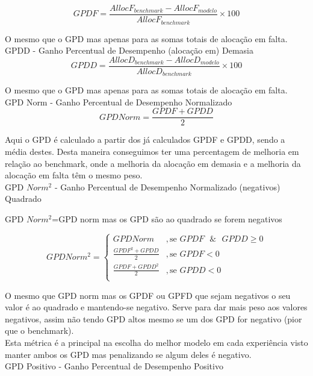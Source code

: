 \begin{equation} \label{eq:gpdf} 
    GPDF = \frac{AllocF_{benchmark} - AllocF_{modelo}}{AllocF_{benchmark}} \times 100
\end{equation}
\smallskip

O mesmo que o GPD mas apenas para as somas totais de alocação em falta.\\
\bigskip
GPDD - Ganho Percentual de Desempenho (alocação em) Demasia\\

\begin{equation} \label{eq:gpdd} 
    GPDD = \frac{AllocD_{benchmark} - AllocD_{modelo}}{AllocD_{benchmark}} \times 100
\end{equation}
\smallskip

O mesmo que o GPD mas apenas para as somas totais de alocação em falta.\\
\bigskip
GPD Norm - Ganho Percentual de Desempenho Normalizado \\

\begin{equation} \label{eq:gpdnorm} 
    GPD Norm = \frac{GPDF + GPDD}{2}
\end{equation}
\smallskip

Aqui o GPD é calculado a partir dos já calculados GPDF e GPDD, sendo a média destes. Desta maneira conseguimos ter uma percentagem de melhoria em relação ao benchmark, onde a melhoria da alocação em demasia e a melhoria da alocação em falta têm o mesmo peso. \\

\bigskip
GPD $Norm^{2}$ - Ganho Percentual de Desempenho Normalizado (negativos) Quadrado

 GPD $Norm^{2}$=GPD norm mas os GPD são ao quadrado se forem negativos  


 \begin{equation} \label{eq:gpdnorm2} 
    GPD Norm^{2} = 
    \begin{cases} 
        GPD Norm & , \text{se } GPDF \text{ }\&\text{ } GPDD \geq 0 \\
        \frac{GPDF^{2} + GPDD}{2} & , \text{se } GPDF  < 0 \\
        \frac{GPDF + GPDD^{2}}{2} & , \text{se } GPDD < 0 \\
    \end{cases} 
\end{equation}
\smallskip


O mesmo que GPD norm mas os GPDF ou GPFD que sejam negativos o seu valor é ao quadrado e mantendo-se negativo. Serve para dar mais peso aos valores negativos, assim não tendo GPD altos mesmo se um dos GPD for negativo (pior que o benchmark). \\
Esta métrica é a principal na escolha do melhor modelo em cada experiência visto manter ambos os GPD mas penalizando se algum deles é negativo. \\
\bigskip
GPD Positivo  - Ganho Percentual de Desempenho Positivo


